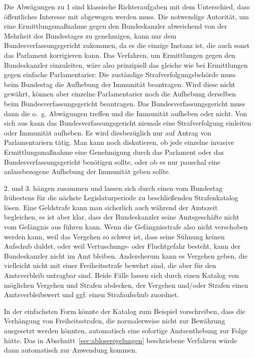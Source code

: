 Die Abwägungen zu 1 sind klassische Richteraufgaben mit dem Unterschied, dass öffentliches Interesse mit abgewogen werden muss.
Die notwendige Autorität, um eine Ermittlungsmaßnahme gegen den Bundeskanzler abweichend von der Mehrheit des Bundestages zu genehmigen, kann nur dem Bundesverfassungsgericht zukommen, da es die einzige Instanz ist, die auch sonst das Parlament korrigieren kann.
Das Verfahren, um Ermittlungen gegen den Bundeskanzler einzuleiten, wäre also prinzipiell das gleiche wie bei Ermittlungen gegen einfache Parlamentarier: Die zuständige Strafverfolgungsbehörde muss beim Bundestag die Aufhebung der Immunität beantragen.
Wird diese nicht gewährt, können aber einzelne Parlamentarier noch die Aufhebung derselben beim Bundesverfassungsgericht beantragen.
Das Bundesverfassungsgericht muss dann die o.~g. Abwägungen treffen und die Immunität aufheben oder nicht.
Von sich aus kann das Bundesverfassungsgericht niemals eine Strafverfolgung einleiten oder Immunität aufheben.
Es wird diesbezüglich nur auf Antrag von Parlamentariern tätig.
Man kann noch diskutieren, ob jede einzelne invasive Ermittlungsmaßnahme eine Genehmigung durch das Parlament oder das Bundesverfassungsgericht benötigen sollte, oder ob es nur pauschal eine anlassbezogene Aufhebung der Immunität geben sollte.

2. und 3. hängen zusammen und lassen sich durch einen vom Bundestag frühestens für die nächste Legislaturperiode zu beschließenden Strafenkatalog lösen.
Eine Geldstrafe kann man sicherlich auch während der Amtszeit begleichen, es ist aber klar, dass der Bundeskanzler seine Amtsgeschäfte nicht vom Gefängnis aus führen kann.
Wenn die Gefängnisstrafe also nicht verschoben werden kann, weil das Vergehen so schwer ist, dass seine Sühnung keinen Aufschub duldet, oder weil Vertuschungs- oder Fluchtgefahr besteht, kann der Bundeskanzler nicht im Amt bleiben.
Andersherum kann es Vergehen geben, die vielleicht nicht mit einer Freiheitsstrafe bewehrt sind, die aber für den Amtsverbleib untragbar sind.
Beide Fälle lassen sich durch einen Katalog von möglichen Vergehen und Strafen abdecken, der Vergehen und/oder Strafen einen Amtsverbleibswert und ggf. einen Strafaufschub zuordnet.

In der einfachsten Form könnte der Katalog zum Beispiel vorschreiben, dass die Verhängung von Freiheitsstrafen, die normalerweise nicht zur Bewährung ausgesetzt werden könnten, automatisch eine sofortige Amtsenthebung zur Folge hätte.
Das in Abschnitt~\ref{sec:abloseregelungen} beschriebene Verfahren würde dann automatisch zur Anwendung kommen.

